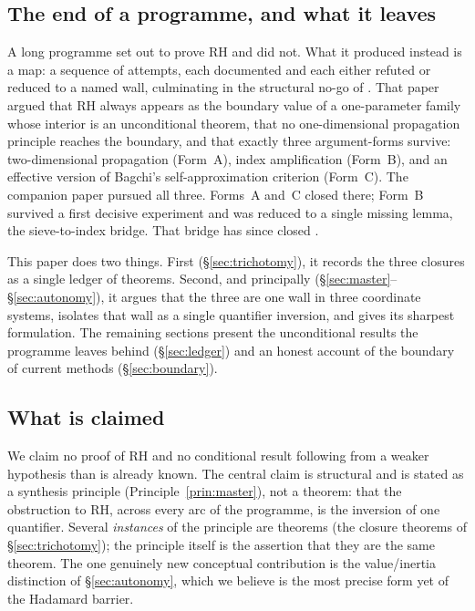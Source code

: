 \documentclass[11pt]{amsart}
\theoremstyle{definition}
\theoremstyle{remark}
\begin{document}
\subsection{The end of a programme, and what it leaves}
A long programme \cite{P40,P41,P42} set out to prove RH and did not. What it
produced instead is a map: a sequence of attempts, each documented and each
either refuted or reduced to a named wall, culminating in the structural
no-go of \cite{P41}. That paper argued that RH always appears as the
boundary value of a one-parameter family whose interior is an unconditional
theorem, that no one-dimensional propagation principle reaches the boundary,
and that exactly three argument-forms survive: two-dimensional propagation
(Form~A), index amplification (Form~B), and an effective version of Bagchi's
self-approximation criterion (Form~C). The companion paper \cite{P42}
pursued all three. Forms~A and~C closed there; Form~B survived a first
decisive experiment and was reduced to a single missing lemma, the
sieve-to-index bridge. That bridge has since closed \cite[]{P40}.

This paper does two things. First (\S\ref{sec:trichotomy}), it records the
three closures as a single ledger of theorems. Second, and principally
(\S\ref{sec:master}--\S\ref{sec:autonomy}), it argues that the three are one
wall in three coordinate systems, isolates that wall as a single quantifier
inversion, and gives its sharpest formulation. The remaining sections present
the unconditional results the programme leaves behind
(\S\ref{sec:ledger}) and an honest account of the boundary of current
methods (\S\ref{sec:boundary}).

\subsection{What is claimed}
We claim no proof of RH and no conditional result following from a weaker
hypothesis than is already known. The central claim is structural and is
stated as a synthesis principle (Principle~\ref{prin:master}), not a theorem:
that the obstruction to RH, across every arc of the programme, is the
inversion of one quantifier. Several \emph{instances} of the principle are
theorems (the closure theorems of \S\ref{sec:trichotomy}); the principle
itself is the assertion that they are the same theorem. The one genuinely new
conceptual contribution is the value/inertia distinction of
\S\ref{sec:autonomy}, which we believe is the most precise form yet of the
Hadamard barrier.
\end{document}
